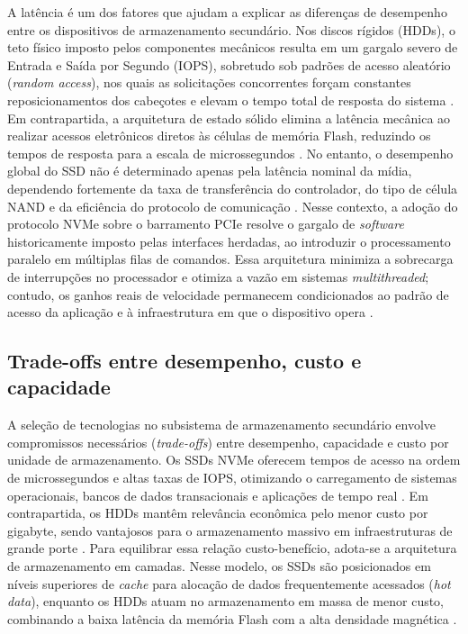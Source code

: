 \documentclass[12pt]{article}
\begin{document}
A latência é um dos fatores que ajudam a explicar as diferenças de desempenho
entre os dispositivos de armazenamento secundário. Nos discos rígidos (HDDs), o teto físico imposto pelos componentes mecânicos resulta em um gargalo severo de Entrada e Saída por Segundo (IOPS), sobretudo sob padrões de acesso aleatório (\textit{random access}), nos quais as solicitações concorrentes forçam constantes reposicionamentos dos cabeçotes e elevam o tempo total de resposta do sistema \cite{stallings2017}. 
Em contrapartida, a arquitetura de estado sólido elimina a latência mecânica ao realizar acessos eletrônicos diretos às células de memória Flash, reduzindo os tempos de resposta para a escala de microssegundos \cite{stallings2017}. No entanto, o desempenho global do SSD não é determinado apenas pela latência nominal da mídia, dependendo fortemente da taxa de transferência do controlador, do tipo de célula NAND e da eficiência do protocolo de comunicação \cite{stallings2017}. 
Nesse contexto, a adoção do protocolo NVMe sobre o barramento PCIe resolve o gargalo de \textit{software} historicamente imposto pelas interfaces herdadas, ao introduzir o processamento paralelo em múltiplas filas de comandos. Essa arquitetura minimiza a sobrecarga de interrupções no processador e otimiza a vazão em sistemas \textit{multithreaded}; contudo, os ganhos reais de velocidade permanecem condicionados ao padrão de acesso da aplicação e à infraestrutura em que o dispositivo opera \cite{nvmexpress2026}.

\subsection{Trade-offs entre desempenho, custo e capacidade}
A seleção de tecnologias no subsistema de armazenamento secundário envolve compromissos necessários (\textit{trade-offs}) entre desempenho, capacidade e custo por unidade de armazenamento. Os SSDs NVMe oferecem tempos de acesso na ordem de microssegundos e altas taxas de IOPS, otimizando o carregamento de sistemas operacionais, bancos de dados transacionais e aplicações de tempo real \cite{stallings2017}. Em contrapartida, os HDDs mantêm relevância econômica pelo menor custo por gigabyte, sendo vantajosos para o armazenamento massivo em infraestruturas de grande porte \cite{silva2025}. Para equilibrar essa relação custo-benefício, adota-se a arquitetura de armazenamento em camadas. Nesse modelo, os SSDs são posicionados em níveis superiores de \textit{cache} para alocação de dados frequentemente acessados (\textit{hot data}), enquanto os HDDs atuam no armazenamento em massa de menor custo, combinando a baixa latência da memória Flash com a alta densidade magnética \cite{santos2014, oliveira2010}.
\end{document}

